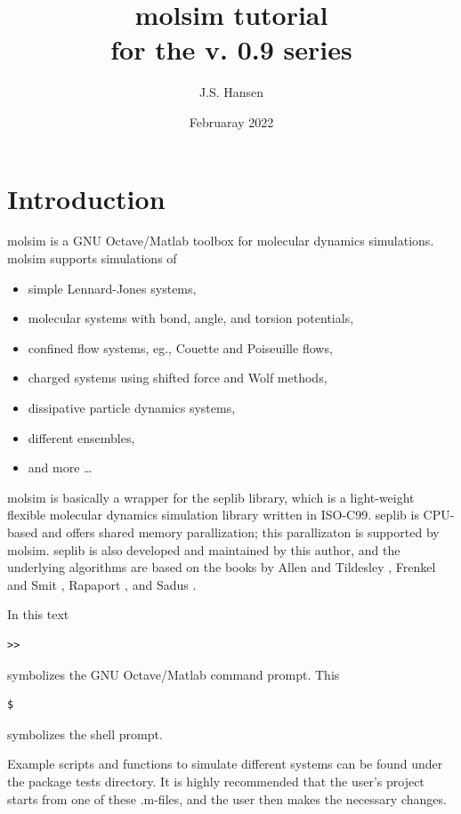 \documentclass[11pt]{article}
\title{\textsf{molsim} tutorial \\ \bigskip \tiny{for the v. 0.9 series}}
\author{J.S. Hansen}
\date{Februaray 2022}
\begin{document}
\maketitle

\section{Introduction}

\textsf{molsim} is a GNU Octave/Matlab toolbox for molecular dynamics
simulations. \textsf{molsim} supports simulations of
\begin{itemize}
\item simple Lennard-Jones systems,
\item molecular systems with bond, angle, and torsion potentials, 
\item confined flow systems, eg., Couette and Poiseuille flows,
\item charged systems using shifted force and Wolf methods,
\item dissipative particle dynamics systems,
\item different ensembles, 
\item and more \ldots
\end{itemize}

\bigskip
\noindent \textsf{molsim} is basically a wrapper for the \textsf{seplib}
library, which is a light-weight flexible molecular dynamics simulation library
written in ISO-C99. \textsf{seplib} is CPU-based and offers shared memory
parallization; this parallizaton is supported by
\textsf{molsim}. \textsf{seplib} is also developed and maintained by this
author, and the underlying algorithms are based on the books by Allen and
Tildesley \cite{AllenTildesley}, Frenkel and Smit \cite{FrenkelSmit}, Rapaport
\cite{Rapaport}, and Sadus \cite{Sadus}.

\bigskip
\noindent In this text
\begin{verbatim}
>> 
\end{verbatim}
symbolizes the GNU Octave/Matlab command prompt. This 
\begin{verbatim}
$ 
\end{verbatim}
symbolizes the shell prompt.

\bigskip
\noindent Example scripts and functions to simulate different systems can be
found under the package \textsf{tests} directory. It is highly recommended that
the user's project starts from one of these \textsf{.m}-files, and the user
then makes the necessary changes.  
\end{document}
